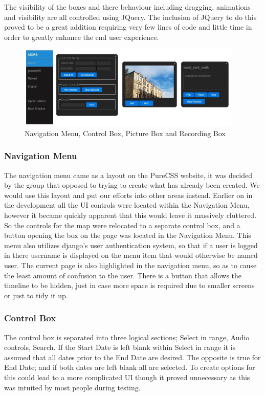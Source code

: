 \documentclass{l3proj}
\begin{document}
The visibility of the boxes and there behaviour including
dragging, animations and visibility are all controlled using
JQuery. The inclusion of JQuery to do this proved to be a great
addition requiring very few lines of code and little time in order to
greatly enhance the end user experience.

\begin{figure}[ht!]
  \centering
\includegraphics[width=0.95\textwidth]{images/ui-elements.jpg}
\caption{Navigation Menu, Control Box, Picture Box and Recording Box}
\end{figure}

\subsubsection{Navigation Menu}

The navigation menu came as a layout on the PureCSS website, it was
decided by the group that opposed to trying to create what has already
been created. We would use this layout and put our efforts into other
areas instead. Earlier on in the development all the UI controls were
located within the Navigation Menu, however it became quickly apparent
that this would leave it massively cluttered. So the controls for the
map were relocated to a separate control box, and a button opening the box on
the page was located in the Navigation Menu. This menu also utilizes django's 
user authentication system, so that if a user is logged in there username is 
displayed on the menu item that would otherwise be named user. The current 
page is also highlighted in the navigation menu, so as to cause the least 
amount of confusion to the user. There is a button that allows the timeline to 
be hidden, just in case more space is required due to smaller screens or just to 
tidy it up. 

\subsubsection{Control Box}
The control box is separated into three logical sections; Select in
range, Audio controls, Search. If the Start Date is left blank within
Select in range it is assumed that all dates prior to the End Date are
desired. The opposite is true for End Date; and if both dates are left
blank all are selected. To create options for this could lead to a
more complicated UI though it proved unnecessary as this was intuited
by most people during testing.
\end{document}
